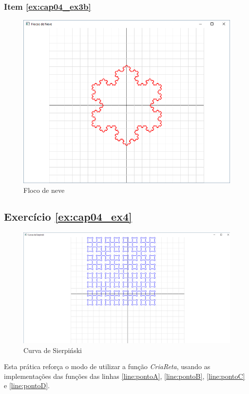 \subsubsection*{Item \ref{ex:cap04_ex3b}}
\begin{figure}[ht]
  \centerline{\includegraphics[width=.5\textwidth]{img/cap4_ex15.png}}
  \caption{Floco de neve}
  \label{fig:cap04_ex3b}
\end{figure}



\subsection*{Exercício \ref{ex:cap04_ex4} }
\begin{figure}[ht]
  \centerline{\includegraphics[width=.5\textwidth]{img/cap4_ex16.png}}
  \caption{Curva de Sierpiński}
  \label{fig:cap04_ex3}
\end{figure}
Esta prática reforça o modo de utilizar a função \emph{CriaReta}, usando as implementações das funções das linhas \ref{line:pontoA}, \ref{line:pontoB}, \ref{line:pontoC} e \ref{line:pontoD}.
